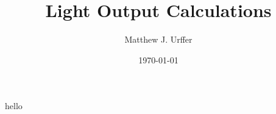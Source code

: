 \documentclass[draftcls,onecolumn]{IEEEtran}
\begin{document}
\title{Light Output Calculations}
\author{Matthew J. Urffer}
\date{\today}
\maketitle

\listoftodos
\printnomenclature
\printindex
\tableofcontents
\listoffigures
\listoftables
\lstlistoflistings

hello

\end{document}
